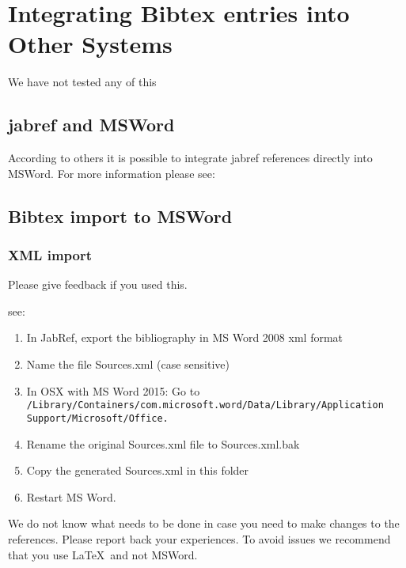 \section{Integrating Bibtex entries into Other Systems}

We have not tested any of this

\subsection{jabref and MSWord}

According to others it is possible to integrate jabref references
directly into MSWord. 
For more information please see:


\subsection{Bibtex import to MSWord}\label{bibtex-import-to-msword}

\subsubsection{XML import}

Please give feedback if you used this.

see:

\begin{enumerate}

\item  In JabRef, export the bibliography in MS Word 2008 xml format

\item  Name the file Sources.xml (case sensitive)
\item   In OSX with MS Word 2015: Go to
  \verb|/Library/Containers/com.microsoft.word/Data/Library/Application Support/Microsoft/Office.|
\item  Rename the original Sources.xml file to Sources.xml.bak
\item  Copy the generated Sources.xml in this folder
\item  Restart MS Word.

\end{enumerate}

We do not know what needs to be done in case you need to make changes to
the references. Please report back your experiences. To avoid issues we
recommend that you use \LaTeX~and not MSWord.

